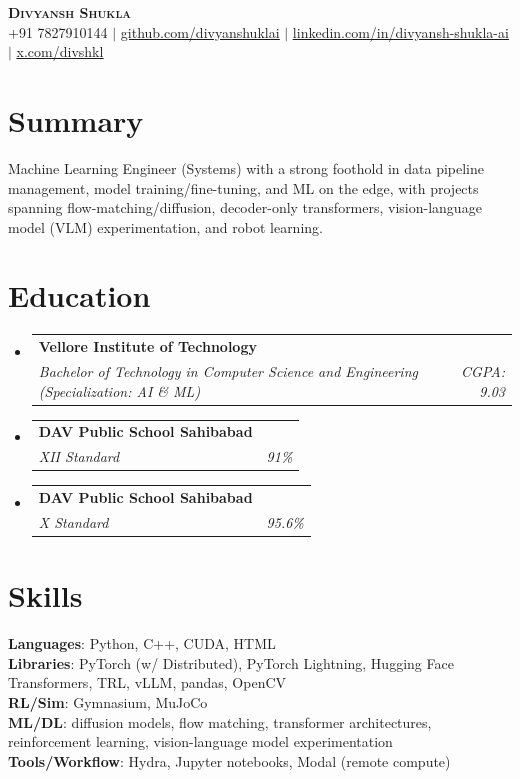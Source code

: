 \documentclass[letterpaper,11pt]{article}
\makeatletter
\newcommand{\resumeSubheading}[4]{
  \vspace{-2pt}\item
    \begin{tabular*}{0.97\textwidth}[t]{l@{\extracolsep{\fill}}r}
      \textbf{#1} & #2 \\
      \textit{\small#3} & \textit{\small #4} \\
    \end{tabular*}\vspace{-7pt}
}
\newcommand{\resumeSubHeadingListStart}{\begin{itemize}[leftmargin=0.15in, label={}, itemsep=2pt]}
\newcommand{\resumeSubHeadingListEnd}{\end{itemize}\vspace{-5pt}}
\makeatother
\begin{document}
\begin{center}
    \textbf{\Huge \scshape Divyansh Shukla} \\ \vspace{1pt}
    \small +91 7827910144 $|$
    \href{https://github.com/divyanshuklai}{\underline{github.com/divyanshuklai}} $|$
    \href{https://www.linkedin.com/in/divyansh-shukla-ai/}{\underline{linkedin.com/in/divyansh-shukla-ai}} $|$
    \href{https://x.com/divshkl}{\underline{x.com/divshkl}}
\end{center}

\section{Summary}
\small{Machine Learning Engineer (Systems) with a strong foothold in data pipeline management, model training/fine-tuning, and ML on the edge, with projects spanning flow-matching/diffusion, decoder-only transformers, vision-language model (VLM) experimentation, and robot learning.}

\section{Education}
  \resumeSubHeadingListStart
    \resumeSubheading
      {Vellore Institute of Technology}{}
      {Bachelor of Technology in Computer Science and Engineering (Specialization: AI \& ML)}{CGPA: 9.03}
    \resumeSubheading
      {DAV Public School Sahibabad}{}
      {XII Standard}{91\%}
    \resumeSubheading
      {DAV Public School Sahibabad}{}
      {X Standard}{95.6\%}
  \resumeSubHeadingListEnd

\section{Skills}
 \begin{itemize}[leftmargin=0.15in, label={}]
    \small{\item{
     \textbf{Languages}{: Python, C++, CUDA, HTML} \\
     \textbf{Libraries}{: PyTorch (w/ Distributed), PyTorch Lightning, Hugging Face Transformers, TRL, vLLM, pandas, OpenCV} \\
     \textbf{RL/Sim}{: Gymnasium, MuJoCo} \\
     \textbf{ML/DL}{: diffusion models, flow matching, transformer architectures, reinforcement learning, vision-language model experimentation} \\
     \textbf{Tools/Workflow}{: Hydra, Jupyter notebooks, Modal (remote compute)}
    }}
 \end{itemize}
\end{document}
